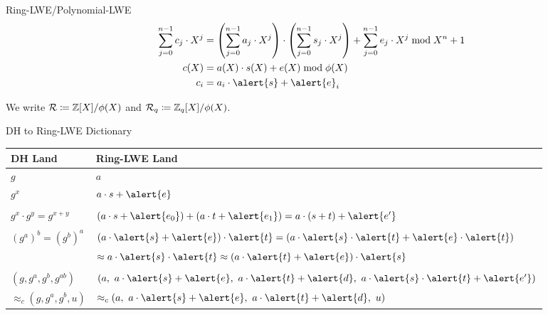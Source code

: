 \documentclass[xcolor=table,10pt,aspectratio=169]{beamer}
\providecommand{\ring}[0]{\ensuremath{\mathcal{R}}\xspace}
\providecommand{\ring}[0]{\ensuremath{\mathcal{R}}\xspace}
\begin{document}
\begin{frame}[label={sec:org5aaa464}]{Ring-LWE/Polynomial-LWE}
\begin{align*}
\sum_{j=0}^{n-1} c_{j} \cdot X^{j} &= \left(\sum_{j=0}^{n-1} a_{j} \cdot X^{j}\right) \cdot \left(\sum_{j=0}^{n-1} s_{j} \cdot X^{j}\right) + \sum_{j=0}^{n-1} e_{j} \cdot X^{j} \bmod X^{n} +1\\
c(X) &= a(X) \cdot s(X) + e(X) \bmod \phi(X)\\
c_i &= a_{i} \cdot \alert{s} + \alert{e}_{i}
\end{align*}

We write \(\ring \coloneqq \ZZ[X]/\phi(X)\) and \(\ring_{q} \coloneqq \ZZ_{q}[X]/\phi(X)\).

{\footnotesize {} \par}

{\footnotesize {} \par}
\end{frame}
\begin{frame}[label={sec:org79a7520}]{DH to Ring-LWE Dictionary}
\begin{center}
\begin{tabular}{ll}
\toprule
DH Land & Ring-LWE Land\\
\midrule
\(g\) & \(a\)\\
\(g^x\) & \(a\cdot {s} + \alert{e}\)\\
 & \\
\(g^x \cdot g^y = g^{x+y}\) & \((a\cdot {s} + \alert{e_0}) + (a \cdot {t} + \alert{e_1}) = a \cdot {(s+t)} + \alert{e'}\)\\
 & \\
\((g^a)^b = (g^b)^a\) & \((a\cdot \alert{s} + \alert{e})\cdot \alert{t} = (a\cdot \alert{s} \cdot \alert{t} + \alert{e} \cdot \alert{t})\)\\
 & \(\approx a\cdot \alert{s} \cdot \alert{t} \approx (a\cdot \alert{t} + \alert{e})\cdot \alert{s}\)\\
 & \\
\((g, g^a, g^b, g^{ab})\) & \((a,\ a\cdot \alert{s} + \alert{e},\ a\cdot \alert{t} + \alert{d},\ a \cdot \alert{s} \cdot \alert{t} + \alert{e'})\)\\
\(\approx_c (g, g^a, g^b, u)\) & \(\approx_c (a,\ a\cdot \alert{s} + \alert{e},\ a\cdot \alert{t} + \alert{d},\ u)\)\\
\bottomrule
\end{tabular}

\end{center}
\end{frame}
\end{document}
